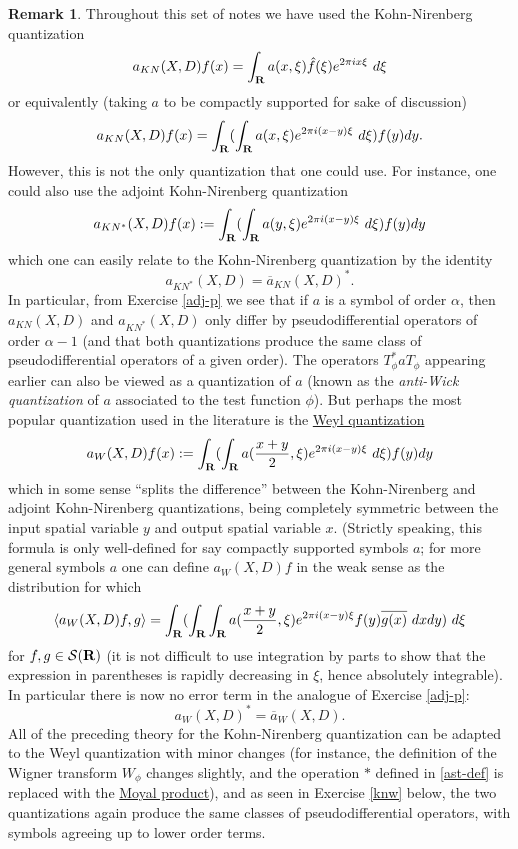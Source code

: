 \documentclass[11pt]{article}
\theoremstyle{definition}
\newtheorem{remark}[theorem]{Remark}
\begin{document}
\begin{remark}
 \label{weyl} Throughout this set of notes we have used the Kohn-Nirenberg quantization 
\[\displaystyle  a_{KN}(X,D) f(x) = \int_{\bf R} a(x,\xi) \hat f(\xi) e^{2\pi i x \xi}\ d\xi\]
 or equivalently (taking \({a}\) to be compactly supported for sake of discussion) 
\[\displaystyle  a_{KN}(X,D) f(x) = \int_{\bf R} (\int_{\bf R} a(x,\xi) e^{2\pi i (x-y) \xi}\ d\xi) f(y) dy.\]
 However, this is not the only quantization that one could use. For instance, one could also use the adjoint Kohn-Nirenberg quantization 
\[\displaystyle  a_{KN^*}(X,D) f(x) := \int_{\bf R} (\int_{\bf R} a(y,\xi) e^{2\pi i (x-y) \xi}\ d\xi) f(y) dy\]
 which one can easily relate to the Kohn-Nirenberg quantization by the identity 
\[\displaystyle  a_{KN^*}(X,D) = \overline{a}_{KN}(X,D)^*.\]
 In particular, from Exercise \ref{adj-p} we see that if \({a}\) is a symbol of order \({\alpha}\), then \({a_{KN}(X,D)}\) and \({a_{KN^*}(X,D)}\) only differ by pseudodifferential operators of order \({\alpha-1}\) (and that both quantizations produce the same class of pseudodifferential operators of a given order). The operators \({T_\phi^* a T_\phi}\) appearing earlier can also be viewed as a quantization of \({a}\) (known as the \emph{anti-Wick quantization} of \({a}\) associated to the test function \({\phi}\)). But perhaps the most popular quantization used in the literature is the \href{https://en.wikipedia.org/wiki/Wigner%E2%80%93Weyl_transform}{Weyl quantization} 
\[\displaystyle  a_{W}(X,D) f(x) := \int_{\bf R} (\int_{\bf R} a(\frac{x+y}{2},\xi) e^{2\pi i (x-y) \xi}\ d\xi) f(y) dy\]
 which in some sense “splits the difference” between the Kohn-Nirenberg and adjoint Kohn-Nirenberg quantizations, being completely symmetric between the input spatial variable \({y}\) and output spatial variable \({x}\). (Strictly speaking, this formula is only well-defined for say compactly supported symbols \({a}\); for more general symbols \({a}\) one can define \({a_W(X,D) f}\) in the weak sense as the distribution for which 
\[\displaystyle  \langle a_{W}(X,D) f, g \rangle = \int_{\bf R} (\int_{\bf R} \int_{\bf R} a(\frac{x+y}{2},\xi) e^{2\pi i (x-y) \xi} f(y) \overline{g(x)}\ dx dy)\ d\xi\]
 for \({f,g \in {\mathcal S}({\bf R})}\) (it is not difficult to use integration by parts to show that the expression in parentheses is rapidly decreasing in \({\xi}\), hence absolutely integrable). In particular there is now no error term in the analogue of Exercise \ref{adj-p}: 
\[\displaystyle  a_W(X,D)^* = \overline{a}_W(X,D).\]
 All of the preceding theory for the Kohn-Nirenberg quantization can be adapted to the Weyl quantization with minor changes (for instance, the definition of the Wigner transform \({W_\phi}\) changes slightly, and the operation \({\ast}\) defined in \eqref{ast-def} is replaced with the \href{https://en.wikipedia.org/wiki/Moyal_product}{Moyal product}), and as seen in Exercise \ref{knw} below, the two quantizations again produce the same classes of pseudodifferential operators, with symbols agreeing up to lower order terms. 
\end{remark}
\end{document}
